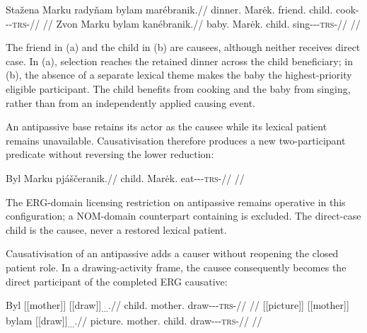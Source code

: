 \pex\label{ex:val-slot-causative-priority}
\a
\begingl
\gla Stažena Marku radyňam bylam marébranik.//
\glb dinner.\Dir{} Marėk.\Trs{} friend.\Ind{} child.\Ind{} cook-\Appl{}-\Caus{}-\textsc{trs}-\Pf{}//
\glft {}
//
\endgl
\a
\begingl
\gla Zvon Marku bylam kanébranik.//
\glb baby.\Dir{} Marėk.\Trs{} child.\Ind{} sing-\Appl{}-\Caus{}-\textsc{trs}-\Pf{}//
\glft {}
//
\endgl
\xe

The friend in (a) and the child in (b) are causees, although neither receives
direct case. In (a), selection reaches the retained dinner across the child
beneficiary; in (b), the absence of a separate lexical theme makes the baby
the highest-priority eligible participant. The child benefits from cooking
and the baby from singing, rather than from an independently applied
causing event.

An antipassive base retains its actor as the causee while its lexical patient
remains unavailable. Causativisation therefore produces a new two-participant
predicate without reversing the lower reduction:

\ex\label{ex:val-caus-antipassive}%
\begingl
\gla Byl Marku pjáščeranik.//
\glb child.\Dir{} Marėk.\Trs{} eat-\Antip{}-\Caus{}-\textsc{trs}-\Pf{}//
\glft {}//
\endgl
\xe

The ERG-domain licensing restriction on antipassive remains operative in this
configuration; a NOM-domain counterpart containing  is excluded.
The direct-case child is the causee, never a restored lexical patient.

Causativisation of an antipassive adds a causer without reopening the
closed patient role. In a drawing-activity frame, the causee consequently
becomes the direct participant of the completed ERG causative:

\pex\label{ex:val-slot-causative-antipassive}
\a
\begingl
\gla Byl \textnormal{[[mother]]}\textsubscript{\Trs{}} \textnormal{[[draw]]}\textsubscript{\Antip{}.\Caus{}.\Trs{}.\Pf{}}.//
\glb child.\Dir{} mother.\Trs{} draw-\Antip{}-\Caus{}-\textsc{trs}-\Pf{}//
\glft {}
//
\endgl
\a
\begingl
\gla *\textnormal{[[picture]]}\textsubscript{\Dir{}} \textnormal{[[mother]]}\textsubscript{\Trs{}} bylam \textnormal{[[draw]]}\textsubscript{\Antip{}.\Caus{}.\Trs{}.\Pf{}}.//
\glb picture.\Dir{} mother.\Trs{} child.\Ind{} draw-\Antip{}-\Caus{}-\textsc{trs}-\Pf{}//
\glft {}
//
\endgl
\xe

